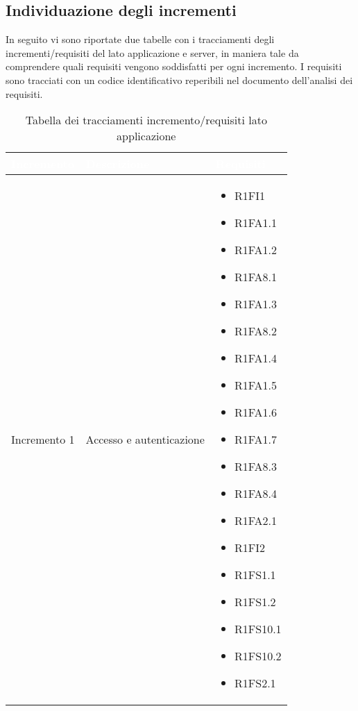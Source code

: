 \subsection{Individuazione degli incrementi}
In seguito vi sono riportate due tabelle con i tracciamenti degli incrementi/requisiti del lato applicazione e server, in maniera tale da comprendere quali requisiti vengono soddisfatti per ogni incremento.
I requisiti sono tracciati con un codice identificativo reperibili nel documento dell'analisi dei requisiti.

{
\renewcommand{\arraystretch}{2}
\centering
	
\begin{longtable}{C{4cm} C{6cm} C{4cm}}
\caption{Tabella dei tracciamenti incremento/requisiti lato applicazione}\\

\textcolor{white}{\textbf{Incremento}} &
\textcolor{white}{\textbf{Descrizione}} & 
\textcolor{white}{\textbf{Requisiti}}\\
\endhead

Incremento 1 & Accesso e autenticazione & \begin{itemize}
    \item[ ] R1FI1
    \item[ ] R1FA1.1
    \item[ ] R1FA1.2
    \item[ ] R1FA8.1
    \item[ ] R1FA1.3
    \item[ ] R1FA8.2
    \item[ ] R1FA1.4
    \item[ ] R1FA1.5
    \item[ ] R1FA1.6
    \item[ ] R1FA1.7
    \item[ ] R1FA8.3
    \item[ ] R1FA8.4
    \item[ ] R1FA2.1
    \item[ ] R1FI2
    \item[ ] R1FS1.1
    \item[ ] R1FS1.2 
    \item[ ] R1FS10.1
    \item[ ] R1FS10.2
    \item[ ] R1FS2.1
\end{itemize}\\


\end{longtable}}
